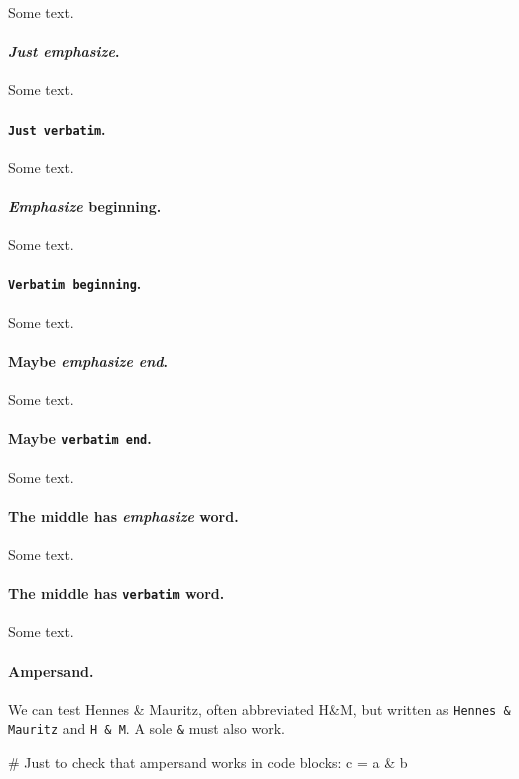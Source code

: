 \documentclass[%
oneside,                 %
final,                   %
10pt]{article}
\theoremstyle{definition}
\begin{document}
\begin{enumerate}
Some text.

\paragraph{\emph{Just emphasize}.}
Some text.

\paragraph{\texttt{Just verbatim}.}
Some text.

\paragraph{\emph{Emphasize} beginning.}
Some text.

\paragraph{\texttt{Verbatim beginning}.}
Some text.

\paragraph{Maybe \emph{emphasize end}.}
Some text.

\paragraph{Maybe \texttt{verbatim end}.}
Some text.

\paragraph{The middle has \emph{emphasize} word.}
Some text.

\paragraph{The middle has \texttt{verbatim} word.}
Some text.

\paragraph{Ampersand.}
We can test Hennes {\&} Mauritz, often abbreviated H{\&}M, but written
as \Verb!Hennes & Mauritz! and \Verb!H & M!.
A sole \Verb!&! must also work.




\bccq
# Just to check that ampersand works in code blocks:
c = a & b


\end{enumerate}
\end{document}
